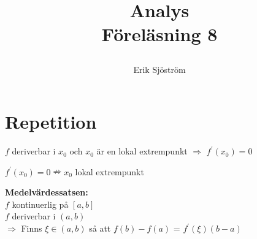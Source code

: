 

\title{
     Analys\\
     Föreläsning 8
    \author{Erik Sjöström}
}

\maketitle

\section{Repetition} %
\label{sec:repetition}
\begin{sats}
    $f$ deriverbar i $x_0$ och $x_0$ är en lokal extrempunkt $\Rightarrow$ $f^\prime(x_0) = 0$
\end{sats}
\begin{Rem}
    $f^\prime(x_0) = 0 \nRightarrow x_0$ lokal extrempunkt
\end{Rem}
\begin{sats}
    \textbf{Medelvärdessatsen:} \\
    $f$ kontinuerlig på $[a,b]$\\
    $f$ deriverbar i $(a,b)$\\
    $\Rightarrow$ Finns $\xi \in (a,b)$ så att $f(b)-f(a)$ = $f^\prime(\xi)(b-a)$
\end{sats}
